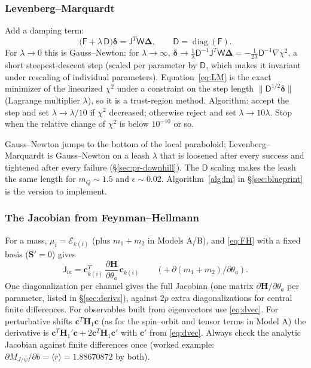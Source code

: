 \documentclass[11pt,a4paper]{article}
\numberwithin{equation}{section}
\theoremstyle{definition}
\theoremstyle{plain}
\theoremstyle{remark}
\newenvironment{plainwords}[1][In plain words]{\begin{tcolorbox}[plainbox,title={\small\bfseries #1},fonttitle=\small,coltitle=white,colbacktitle=ForestGreen!60!black]}{\end{tcolorbox}}
\numberwithin{algorithm}{section}
\newcommand{\diag}{\operatorname{diag}}
\newcommand{\sD}{\mathsf D}
\newcommand{\mH}{\mathbf H}
\newcommand{\mS}{\mathbf S}
\newcommand{\vc}{\bm c}
\newcommand{\sJ}{\mathsf J}
\newcommand{\sW}{\mathsf W}
\newcommand{\sF}{\mathsf F}
\newcommand{\vD}{\bm\Delta}
\begin{document}
\subsubsection{Levenberg--Marquardt}
Add a damping term:
\begin{equation}
\big(\sF+\lambda\,\sD\big)\bm\delta=\sJ^T\sW\vD,\qquad \sD=\diag(\sF).
\label{eq:LM}
\end{equation}
For $\lambda\to0$ this is Gauss--Newton; for $\lambda\to\infty$, $\bm\delta\to\frac1\lambda\sD^{-1}\sJ^T\sW\vD=-\frac1{2\lambda}\sD^{-1}\nabla\chi^2$, a short steepest-descent step (scaled per parameter by $\sD$, which makes it invariant under rescaling of individual parameters). Equation~\eqref{eq:LM} is the exact minimizer of the linearized $\chi^2$ under a constraint on the step length $\|\sD^{1/2}\bm\delta\|$ (Lagrange multiplier $\lambda$), so it is a trust-region method. Algorithm: accept the step and set $\lambda\to\lambda/10$ if $\chi^2$ decreased; otherwise reject and set $\lambda\to10\lambda$. Stop when the relative change of $\chi^2$ is below $10^{-10}$ or so.
\begin{plainwords}[In plain words]
Gauss--Newton jumps to the bottom of the local paraboloid; Levenberg--Marquardt is Gauss--Newton on a leash $\lambda$ that is loosened after every success and tightened after every failure (\S\ref{sec:pr-downhill}). The $\sD$ scaling makes the leash the same length for $m_Q\sim1.5$ and $\epsilon\sim0.02$. Algorithm~\ref{alg:lm} in \S\ref{sec:blueprint} is the version to implement.
\end{plainwords}

\subsubsection{The Jacobian from Feynman--Hellmann}
For a mass, $\mu_i=\mathcal E_{k(i)}$ (plus $m_1+m_2$ in Models A/B), and \eqref{eq:FH} with a fixed basis ($\mS'=0$) gives
\begin{equation}
\sJ_{ia}=\vc_{k(i)}^T\,\frac{\partial\mH}{\partial\theta_a}\,\vc_{k(i)}\qquad(+\,\partial(m_1+m_2)/\partial\theta_a).
\end{equation}
One diagonalization per channel gives the full Jacobian (one matrix $\partial\mH/\partial\theta_a$ per parameter, listed in \S\ref{sec:derivs}), against $2p$ extra diagonalizations for central finite differences. For observables built from eigenvectors use \eqref{eq:dvec}. For perturbative shifts $\vc^T\mH_1\vc$ (as for the spin--orbit and tensor terms in Model A) the derivative is $\vc^T\mH_1'\vc+2\vc^T\mH_1\vc'$ with $\vc'$ from \eqref{eq:dvec}. Always check the analytic Jacobian against finite differences once (worked example: $\partial M_{J/\psi}/\partial b=\langle r\rangle=1.88670872$ by both).
\end{document}
